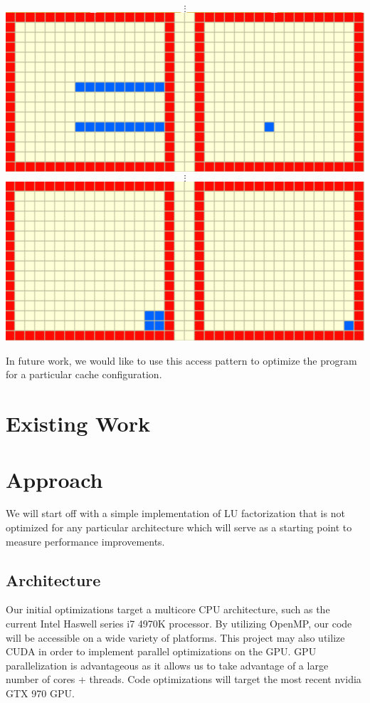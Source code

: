 \documentclass[12]{article}
\begin{document}
\begin{center}
$$\vdots$$
\includegraphics[scale=0.33]{figures/lu6}
$$\vdots$$
\includegraphics[scale=0.33]{figures/lu7}
\end{center}

In future work, we would like to use this access pattern to optimize the program for a particular cache configuration.

\section{Existing Work}

\section{Approach}

We will start off with a simple implementation of LU factorization that is not optimized for any particular architecture which will serve as a starting point to measure performance improvements.


\subsection{Architecture}

Our initial optimizations target a multicore CPU architecture, such as the current Intel Haswell series i7 4970K processor. By utilizing OpenMP, our code will be accessible on a wide variety of platforms. This project may also utilize CUDA in order to implement parallel optimizations on the GPU. GPU parallelization is advantageous as it allows us to take advantage of a large number of cores + threads. Code optimizations will target the most recent nvidia GTX 970 GPU. 
\end{document}
